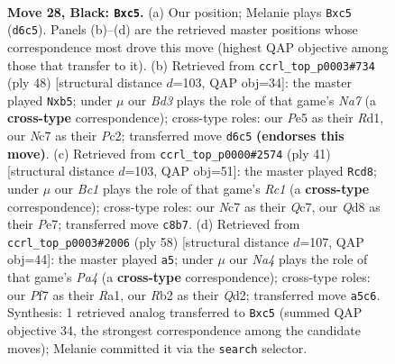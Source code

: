 \documentclass[11pt]{article}
\begin{document}
\clearpage

\begin{figure}[p]\centering
\begin{subfigure}{0.46\textwidth}\centering
\resizebox{\linewidth}{!}{%
\newchessgame
\chessboard[
  setfen={2bq3r/2n2pk1/p2b2p1/n1B1p2p/P3P3/N1PPQ2N/Br2RPPP/R4K2 b - - 0 28},
  showmover=false,
  pgfstyle=straightmove, color=movearrow, markmove={d6-c5}
]}
\caption{}
\end{subfigure}\hfill
\begin{subfigure}{0.46\textwidth}\centering
\resizebox{\linewidth}{!}{%
\newchessgame
\chessboard[
  setfen={4rbk1/Nrq2p2/R2pp1p1/1b2n2p/1p1BP3/1P4PP/2PQ1PBK/3R4 w - - 8 25},
  showmover=false,
  pgfstyle=straightmove, color=movearrow, markmove={a7-b5}
]}
\caption{}
\end{subfigure}
\\[4pt]
\begin{subfigure}{0.46\textwidth}\centering
\resizebox{\linewidth}{!}{%
\newchessgame
\chessboard[
  setfen={2r3k1/1pq1ppb1/p4n1p/4pPp1/3rN3/P2B1Q1P/1PP2PP1/1R2R1K1 b - - 2 21},
  showmover=false,
  pgfstyle=straightmove, color=movearrow, markmove={c8-d8}
]}
\caption{}
\end{subfigure}\hfill
\begin{subfigure}{0.46\textwidth}\centering
\resizebox{\linewidth}{!}{%
\newchessgame
\chessboard[
  setfen={5rk1/4nqp1/1p1b4/3p3p/Pn1Pp3/2RbB1NP/1P1Q1PPN/R5K1 w - - 6 30},
  showmover=false,
  pgfstyle=straightmove, color=movearrow, markmove={a4-a5}
]}
\caption{}
\end{subfigure}
\caption{\textbf{Move 28, Black: \texttt{Bxc5}.} (a) Our position; Melanie plays \texttt{Bxc5} (\texttt{d6c5}). Panels (b)--(d) are the retrieved master positions whose correspondence most drove this move (highest QAP objective among those that transfer to it). (b) Retrieved from \texttt{ccrl\_top\_p0003\#734} (ply 48) [structural distance $d$=103, QAP obj=34]: the master played \texttt{Nxb5}; under $\mu$ our \emph{Bd3} plays the role of that game's \emph{Na7} (a \textbf{cross-type} correspondence); cross-type roles: our \emph{P}e5 as their \emph{R}d1, our \emph{N}c7 as their \emph{P}c2; transferred move \texttt{d6c5} \textbf{(endorses this move)}. (c) Retrieved from \texttt{ccrl\_top\_p0000\#2574} (ply 41) [structural distance $d$=103, QAP obj=51]: the master played \texttt{Rcd8}; under $\mu$ our \emph{Bc1} plays the role of that game's \emph{Rc1} (a \textbf{cross-type} correspondence); cross-type roles: our \emph{N}c7 as their \emph{Q}c7, our \emph{Q}d8 as their \emph{P}e7; transferred move \texttt{c8b7}. (d) Retrieved from \texttt{ccrl\_top\_p0003\#2006} (ply 58) [structural distance $d$=107, QAP obj=44]: the master played \texttt{a5}; under $\mu$ our \emph{Na4} plays the role of that game's \emph{Pa4} (a \textbf{cross-type} correspondence); cross-type roles: our \emph{P}f7 as their \emph{R}a1, our \emph{R}b2 as their \emph{Q}d2; transferred move \texttt{a5c6}. Synthesis: 1 retrieved analog transferred to \texttt{Bxc5} (summed QAP objective 34, the strongest correspondence among the candidate moves); Melanie committed it via the \texttt{search} selector.}
\label{fig:thought-m55}
\end{figure}
\end{document}
